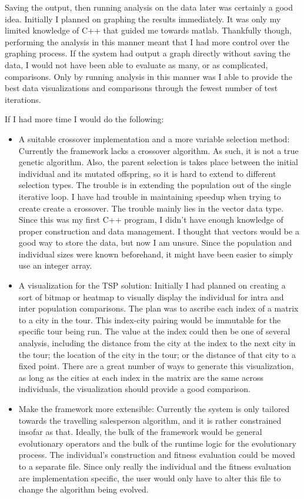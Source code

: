 \documentclass[10pt,letterpaper]{article}
\begin{document}
Saving the output, then running analysis on the data later was certainly a good idea. Initially I planned on graphing the results immediately. It was only my limited knowledge of C++ that guided me towards matlab. Thankfully though, performing the analysis in this manner meant that I had more control over the graphing process. If the system had output a graph directly without saving the data, I would not have been able to evaluate as many, or as complicated, comparisons. Only by running analysis in this manner was I able to provide the best data visualizations and comparisons through the fewest number of test iterations.

If I had more time I would do the following:
\begin{itemize}
\item A suitable crossover implementation and a more variable selection method: Currently the framework lacks a crossover algorithm. As such, it is not a true genetic algorithm. Also, the parent selection is takes place between the initial individual and its mutated offspring, so it is hard to extend to different selection types. The trouble is in extending the population out of the single iterative loop. I have had trouble in maintaining speedup when trying to create create a crossover. The trouble mainly lies in the vector data type. Since this was my first C++ program, I didn't have enough knowledge of proper construction and data management. I thought that vectors would be a good way to store the data, but now I am unsure. Since the population and individual sizes were known beforehand, it might have been easier to simply use an integer array.
\item A visualization for the TSP solution: Initially I had planned on creating a sort of bitmap or heatmap to visually display the individual for intra and inter population comparisons. The plan was to ascribe each index of a matrix to a city in the tour. This index-city pairing would be immutable for the specific tour being run. The value at the index could then be one of several analysis, including the distance from the city at the index to the next city in the tour; the location of the city in the tour; or the distance of that city to a fixed point. There are a great number of ways to generate this visualization, as long as the cities at each index in the matrix are the same across individuals, the visualization should provide a good comparison.
\item Make the framework more extensible: Currently the system is only tailored towards the travelling salesperson algorithm, and it is rather constrained insofar as that. Ideally, the bulk of the framework would be general evolutionary operators and the bulk of the runtime logic for the evolutionary process. The individual's construction and fitness evaluation could be moved to a separate file. Since only really the individual and the fitness evaluation are implementation specific, the user would only have to alter this file to change the algorithm being evolved.

\end{itemize}
\end{document}
